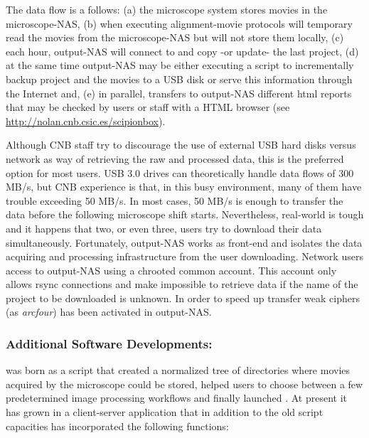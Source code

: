 The data flow is a follows: (a) the microscope system stores movies in the microscope-NAS, (b) when executing alignment-movie protocols \scipionbox will temporary read the movies from 
the microscope-NAS but will not store them locally, (c) each hour, output-NAS will connect to \scipionbox and copy -or update- the last \scipion project, (d) at the same time output-NAS may be either executing a script to incrementally backup \scipion project and the movies to a USB disk or serve this information through the Internet and, (e) in parallel, \scipionbox transfers to  output-NAS different html reports that may be checked by users or staff with a HTML browser (see \url{http://nolan.cnb.csic.es/scipionbox}).

Although CNB staff try to discourage the use of external USB hard disks versus network as way of retrieving the raw and processed data, this is the preferred option for most users.
USB 3.0 drives can theoretically handle data flows of 300 MB/s, but CNB experience is that, in this busy environment, many of them  have trouble exceeding 50 MB/s. In most cases, 50 MB/s is enough to transfer the data before the following microscope shift starts. Nevertheless, real-world is tough and it happens that two, or even three,  users try to download their data simultaneously. Fortunately, output-NAS works as front-end and isolates the data acquiring and processing infrastructure from the user downloading. Network users access to output-NAS using a chrooted common account. This account only allows rsync connections and make impossible to retrieve data if the name of the project to be downloaded is unknown. In order to speed up transfer weak ciphers (as \emph{arcfour}) has been activated in output-NAS.

\subsubsection{Additional Software Developments: \emadmin}

\emadmin was born as a script that created a normalized tree of directories  
where movies acquired by the microscope could be stored, helped users to choose between a few predetermined image processing workflows and finally launched \scipion. At present it has grown in a client-server application that in addition to the old script capacities has incorporated the following functions:

